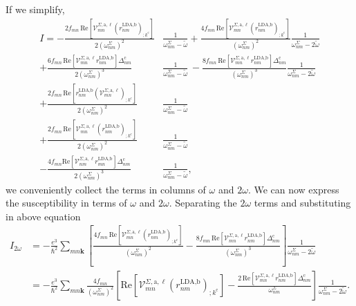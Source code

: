 \documentclass[letterpaper,aps]{revtex4}
\begin{document}
If we simplify,
\begin{align}\label{simplified_i} 
I =
-   \frac{2f_{mn}\,\mathrm{Re}\left[\mathcal{V}^{\Sigma,\text{a},\ell}_{mn}
    \left(r^{\text{LDA,b}}_{nm}\right)_{;k^{\text{c}}}\right]}
    {2(\omega^{\Sigma}_{nm})^{2}}&\frac{1}{\omega^{\Sigma}_{nm}-\tilde\omega}
+   \frac{4f_{mn}\,\mathrm{Re}\left[\mathcal{V}^{\Sigma,\text{a},\ell}_{mn}
    \left(r^{\text{LDA,b}}_{nm}\right)_{;k^{\text{c}}}\right]}
    {(\omega^{\Sigma}_{nm})^{2}}\frac{1}{\omega^{\Sigma}_{nm}-2\tilde\omega}\nonumber\\
+   \frac{6f_{mn}\,\mathrm{Re}\left[\mathcal{V}^{\Sigma,\text{a},\ell}_{mn}
    r^{\text{LDA,b}}_{nm}\right]
    \Delta^{\text{c}}_{nm}}{2(\omega^{\Sigma}_{nm})^{3}}
    &\frac{1}{\omega^{\Sigma}_{nm}-\tilde\omega} 
\,- \frac{8f_{mn}\,\mathrm{Re}\left[\mathcal{V}^{\Sigma,\text{a},\ell}_{mn}
    r^{\text{LDA,b}}_{nm}\right]\Delta^{\text{c}}_{nm}}{(\omega^{\Sigma}_{nm})^{3}}
    \frac{1}{\omega^{\Sigma}_{nm}-2\tilde\omega}\nonumber\\
+   \frac{2f_{mn}\,\mathrm{Re}\left[r^{\text{LDA,b}}_{nm}
    \left(\mathcal{V}^{\Sigma,\text{a},\ell}_{mn}\right)
    _{;k^{\text{c}}}\right]}{2(\omega^{\Sigma}_{nm})^{2}}
    &\frac{1}{\omega^{\Sigma}_{nm}-\tilde\omega}\nonumber\\
+   \frac{2f_{mn}\,\mathrm{Re}\left[\mathcal{V}^{\Sigma,\text{a},\ell}_{mn}
    \left(r^{\text{LDA,b}}_{nm}\right)_{;k^{\text{c}}}\right]}
    {2(\omega^{\Sigma}_{nm})^{2}}&\frac{1}{\omega^{\Sigma}_{nm}-\tilde\omega}\nonumber\\
-   \frac{4f_{mn}\mathrm{Re}\left[\mathcal{V}^{\Sigma,\text{a},\ell}_{nm}
    r^{\text{LDA,b}}_{mn}\right]\Delta_{nm}^{\text{c}}}{2(\omega^{\Sigma}_{nm})^{3}}
    &\frac{1}{\omega^{\Sigma}_{nm}-\tilde\omega}
,
\end{align}
we conveniently collect the terms in columns of $\omega$ and $2\omega$. 
We can now express the susceptibility in terms of $\omega$ and $2\omega$. 
Separating the $2\omega$ terms and substituting in above equation
\begin{align}\label{2wchii}
I_{2\omega}
&=  -\frac{e^{3}}{\hbar^2}\sum_{mn\mathbf{k}}\left[\frac{4f_{mn}\,\mathrm{Re}
    \left[\mathcal{V}^{\Sigma,\text{a},\ell}_{mn}
    \left(r^{\text{LDA,b}}_{nm}\right)_{;k^{\text{c}}}\right]}
    {(\omega^{\Sigma}_{nm})^{2}} - \frac{8f_{mn}\,\mathrm{Re}
    \left[\mathcal{V}^{\Sigma,\text{a},\ell}_{mn}r^{\text{LDA,b}}_{nm}\right]
    \Delta^{\text{c}}_{nm}}{(\omega^{\Sigma}_{nm})^{3}}\right]
    \frac{1}{\omega^{\Sigma}_{nm}-2\tilde\omega}\nonumber\\
&=  -\frac{e^3}{\hbar^2}\sum_{mn\mathbf{k}}
    \frac{4f_{mn}}{(\omega^{\Sigma}_{nm})^{2}}
    \left[\mathrm{Re}\left[\mathcal{V}^{\Sigma,\text{a},\ell}_{mn}
    \left(r^{\text{LDA,b}}_{nm}\right)_{;k^{\text{c}}}\right] 
-   \frac{2\,\mathrm{Re}\left[\mathcal{V}^{\Sigma,\text{a},\ell}_{mn}
    r^{\text{LDA,b}}_{nm}\right]\Delta^{\text{c}}_{nm}}{\omega^{\Sigma}_{nm}}\right]
    \frac{1}{\omega^{\Sigma}_{nm}-2\tilde\omega}
.
\end{align}
\end{document}
